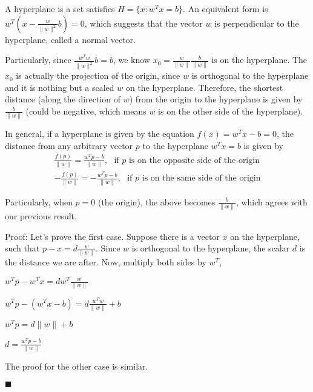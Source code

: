 \documentclass{book}
\begin{document}

A hyperplane is a set satisfies $H=\{x:w^Tx=b\}$. An equivalent form is $w^T(x-\frac{w}{\|w\|^2}b) = 0$, which suggests that the vector $w$ is perpendicular to the hyperplane, called a normal vector.

Particularly, since $\frac{w^Tw}{\|w\|^2}b = b$, we know $x_0=\frac{w}{\|w\|}\frac{b}{\|w\|}$ is on the hyperplane. The $x_0$ is actually the projection of the origin, since $w$ is orthogonal to the hyperplane and it is nothing but a scaled $w$ on the hyperplane. Therefore, the shortest distance (along the direction of $w$) from the origin to the hyperplane is given by $\frac{b}{\|w\|}$ (could be negative, which means $w$ is on the other side of the hyperplane).

In general, if a hyperplane is given by the equation $f(x) = w^Tx-b = 0$, the distance from any arbitrary vector $p$ to the hyperplane $w^Tx=b$ is given by
\begin{align}
	\frac{f(p)}{\|w\|} = \frac{w^Tp-b}{\|w\|}, ~~~ \mbox{if $p$ is on the opposite side of the origin}\\
	-\frac{f(p)}{\|w\|} = -\frac{w^Tp-b}{\|w\|}, ~~~ \mbox{if $p$ is on the same side of the origin}
\end{align}	

Particularly, when $p=0$ (the origin), the above becomes $\frac{b}{\|w\|}$, which agrees with our previous result.

Proof: Let's prove the first case. Suppose there is a vector $x$ on the hyperplane, such that $p-x = d\frac{w}{\|w\|}$. Since $w$ is orthogonal to the hyperplane, the scalar $d$ is the distance we are after. Now, multiply both sides by $w^T$,

$w^Tp-w^Tx = dw^T\frac{w}{\|w\|}$

$w^Tp-(w^Tx-b) = d\frac{w^Tw}{\|w\|}+b$

$w^Tp = d\|w\| + b$

$d = \frac{w^Tp-b}{\|w\|}$

The proof for the other case is similar.

$\blacksquare$
\end{document}

